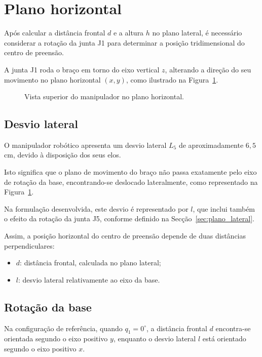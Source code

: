 
\section{Plano horizontal}
\label{sec:plano_horizontal}

Após calcular a distância frontal $d$ e a altura $h$ no plano lateral, é necessário considerar a rotação da junta J1 para determinar a posição tridimensional do centro de preensão.

A junta J1 roda o braço em torno do eixo vertical $z$, alterando a direção do seu movimento no plano horizontal $(x,y)$, como ilustrado na Figura~\ref{fig:topo}.

\begin{figure}[htbp]
    \centering
    \resizebox{0.6\textwidth}{!}{}
    \caption{Vista superior do manipulador no plano horizontal.}
    \label{fig:topo}
\end{figure}

\subsection{Desvio lateral}

O manipulador robótico apresenta um desvio lateral $L_5$ de aproximadamente $6{,}5$ cm, devido à disposição dos seus elos.

Isto significa que o plano de movimento do braço não passa exatamente pelo eixo de rotação da base, encontrando-se deslocado lateralmente, como representado na Figura~\ref{fig:topo}.

Na formulação desenvolvida, este desvio é representado por $l$, que inclui também o efeito da rotação da junta J5, conforme definido na Secção~\ref{sec:plano_lateral}.

Assim, a posição horizontal do centro de preensão depende de duas distâncias perpendiculares:
\begin{itemize}
    \item $d$: distância frontal, calculada no plano lateral;
    \item $l$: desvio lateral relativamente ao eixo da base.
\end{itemize}

\subsection{Rotação da base}

Na configuração de referência, quando $q_1=0^\circ$, a distância frontal $d$ encontra-se orientada segundo o eixo positivo $y$, enquanto o desvio lateral $l$ está orientado segundo o eixo positivo $x$.

